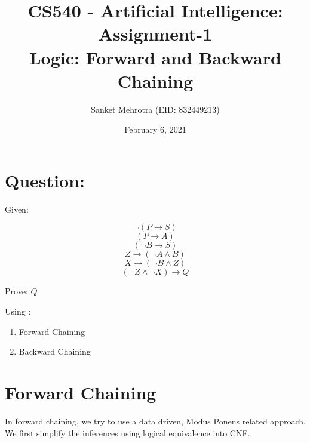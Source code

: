 \documentclass[a4paper]{article}
\title{CS540 - Artificial Intelligence: Assignment-1 \\Logic: Forward and Backward Chaining}
\author{Sanket Mehrotra (EID: 832449213) }
\date{February 6, 2021}
\begin{document}
\maketitle

\section{Question:}

\parindent
Given:

$$\lnot(P \to S)$$
$$(P \to A)$$
$$(\lnot B \to S)$$
$$Z \to (\lnot A \land B)$$
$$X \to (\lnot B \land Z)$$
$$(\lnot Z \land \lnot X ) \to Q$$

Prove: $Q$ 


Using : \begin{enumerate}
    \item Forward Chaining
    \item Backward Chaining
\end{enumerate}

\newpage
\section{Forward Chaining}

In forward chaining, we try to use a data driven, Modus Ponens related approach.\\
We first simplify the inferences using logical equivalence into CNF.
\end{document}
